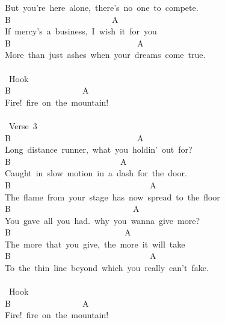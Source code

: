 {But\ you're\ here\ alone,\ there's\ no\ one\ to\ compete.\\
B\ \ \ \ \ \ \ \ \ \ \ \ \ \ \ \ \ \ \ \ \ \ \ \ A\\
If\ mercy's\ a\ business,\ I\ wish\ it\ for\ you\\
B\ \ \ \ \ \ \ \ \ \ \ \ \ \ \ \ \ \ \ \ \ \ \ \ \ \ \ \ \ \ A\\
More\ than\ just\ ashes\ when\ your\ dreams\ come\ true.\\
\\
\lbrack\ Hook\rbrack\\
B\ \ \ \ \ \ \ \ \ \ \ \ \ \ \ \ \ A\\
Fire!\ fire\ on\ the\ mountain!\\
\\
\lbrack\ Verse\ 3\rbrack\\
B\ \ \ \ \ \ \ \ \ \ \ \ \ \ \ \ \ \ \ \ \ \ \ \ \ \ \ \ \ \ A\\
Long\ distance\ runner,\ what\ you\ holdin'\ out\ for?\\
B\ \ \ \ \ \ \ \ \ \ \ \ \ \ \ \ \ \ \ \ \ \ \ \ \ \ A\\
Caught\ in\ slow\ motion\ in\ a\ dash\ for\ the\ door.\\
B\ \ \ \ \ \ \ \ \ \ \ \ \ \ \ \ \ \ \ \ \ \ \ \ \ \ \ \ \ \ \ \ \ A\\
The\ flame\ from\ your\ stage\ has\ now\ spread\ to\ the\ floor\\
B\ \ \ \ \ \ \ \ \ \ \ \ \ \ \ \ \ \ \ \ \ \ \ \ \ \ \ \ \ A\\
You\ gave\ all\ you\ had.\ why\ you\ wanna\ give\ more?\\
B\ \ \ \ \ \ \ \ \ \ \ \ \ \ \ \ \ \ \ \ \ \ \ \ \ \ \ A\\
The\ more\ that\ you\ give,\ the\ more\ it\ will\ take\\
B\ \ \ \ \ \ \ \ \ \ \ \ \ \ \ \ \ \ \ \ \ \ \ \ \ \ \ \ \ \ \ \ \ A\\
To\ the\ thin\ line\ beyond\ which\ you\ really\ can't\ fake.\\
\\
\lbrack\ Hook\rbrack\\
B\ \ \ \ \ \ \ \ \ \ \ \ \ \ \ \ \ A\\
Fire!\ fire\ on\ the\ mountain!\ }

